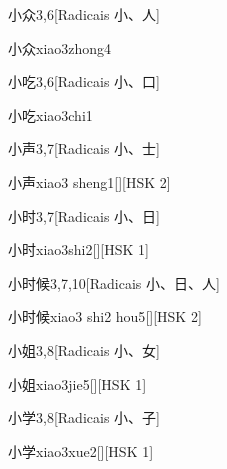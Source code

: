 \begin{entry}{小众}{3,6}[Radicais ⼩、⼈]
  \begin{phonetics}{小众}{xiao3zhong4}
  \end{phonetics}
\end{entry}

\begin{entry}{小吃}{3,6}[Radicais ⼩、⼝]
  \begin{phonetics}{小吃}{xiao3chi1}
  \end{phonetics}
\end{entry}

\begin{entry}{小声}{3,7}[Radicais ⼩、⼠]
  \begin{phonetics}{小声}{xiao3 sheng1}[][HSK 2]
  \end{phonetics}
\end{entry}

\begin{entry}{小时}{3,7}[Radicais ⼩、⽇]
  \begin{phonetics}{小时}{xiao3shi2}[][HSK 1]
  \end{phonetics}
\end{entry}

\begin{entry}{小时候}{3,7,10}[Radicais ⼩、⽇、⼈]
  \begin{phonetics}{小时候}{xiao3 shi2 hou5}[][HSK 2]
  \end{phonetics}
\end{entry}

\begin{entry}{小姐}{3,8}[Radicais ⼩、⼥]
  \begin{phonetics}{小姐}{xiao3jie5}[][HSK 1]
  \end{phonetics}
\end{entry}

\begin{entry}{小学}{3,8}[Radicais ⼩、⼦]
  \begin{phonetics}{小学}{xiao3xue2}[][HSK 1]
  \end{phonetics}
\end{entry}

